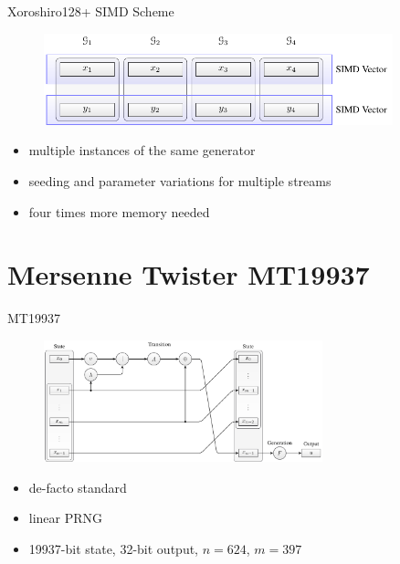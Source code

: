 \documentclass[aspectratio=169]{beamer}
\begin{document}
    \begin{frame}{Xoroshiro128+ SIMD Scheme}
      \begin{figure}
        \includegraphics[width=0.9\textwidth]{figures/xrsr128p_vector_layout.pdf}
      \end{figure}
      \begin{itemize}
        \pause
        \item multiple instances of the same generator
        \pause
        \item seeding and parameter variations for multiple streams
        \pause
        \item four times more memory needed
      \end{itemize}
    \end{frame}

    \section{Mersenne Twister MT19937}
    \begin{frame}{MT19937}
      \begin{figure}
        \includegraphics[width=0.72\textwidth]{figures/mt19937_scheme.pdf}
      \end{figure}
      \begin{itemize}
        \pause
        \item de-facto standard
        \pause
        \item linear PRNG
        \pause
        \item 19937-bit state, 32-bit output, $n=624$, $m=397$
      \end{itemize}
    \end{frame}
\end{document}
